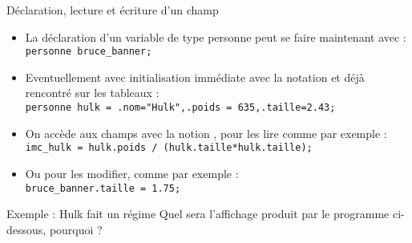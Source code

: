 \documentclass[10pt]{beamer}
\begin{document}
\begin{frame}[fragile]{\Ctitle}{\stitle}
	\begin{exampleblock}{Déclaration, lecture et écriture d'un champ}
		\begin{itemize}
			\item<1-> La déclaration d'un variable de type personne peut se faire maintenant avec : \\
				\texttt{personne bruce_banner;}
			\item<2-> Eventuellement avec initialisation immédiate avec la notation \kw{\{} et \kw{\}} déjà rencontré sur les tableaux : \\
				\texttt{personne hulk = {.nom="Hulk",.poids = 635,.taille=2.43};}
			\item<3-> On accède aux champs avec la notion , pour les lire comme par exemple :\\
				\texttt{imc_hulk = hulk.poids / (hulk.taille*hulk.taille);}
			\item<4-> Ou pour les modifier, comme par exemple : \\
				\texttt{bruce_banner.taille = 1.75;}
		\end{itemize}
	\end{exampleblock}
\end{frame}

\begin{frame}[fragile]{\Ctitle}{\stitle}
	\begin{exampleblock}{Exemple : Hulk fait un régime}
		Quel sera l'affichage produit par le programme ci-dessous, pourquoi ?
	\end{exampleblock}
\end{frame}
\end{document}
